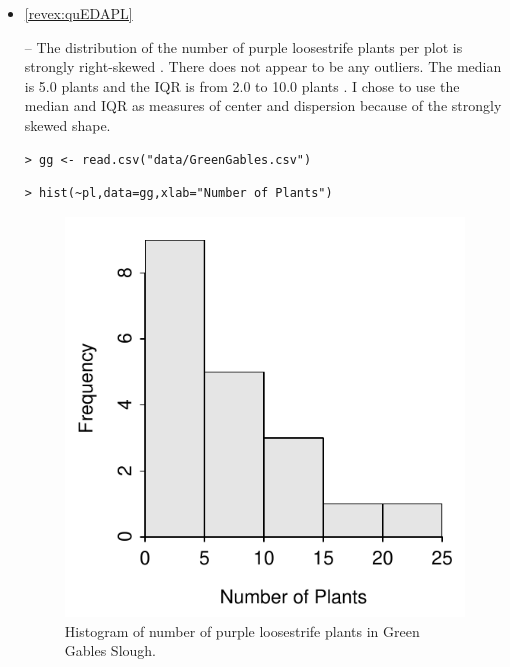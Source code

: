 \documentclass[10pt,openany]{book}\usepackage[]{graphicx}\usepackage[]{color}
\makeatletter
\newenvironment{kframe}{%
 \def\at@end@of@kframe{}%
 \ifinner\ifhmode%
  \def\at@end@of@kframe{\end{minipage}}%
  \begin{minipage}{\columnwidth}%
 \fi\fi%
 \def\FrameCommand##1{\hskip\@totalleftmargin \hskip-\fboxsep
 \colorbox{shadecolor}{##1}\hskip-\fboxsep
     \hskip-\linewidth \hskip-\@totalleftmargin \hskip\columnwidth}%
 \MakeFramed {\advance\hsize-\width
   \@totalleftmargin\z@ \linewidth\hsize
   \@setminipage}}%
 {\par\unskip\endMakeFramed%
 \at@end@of@kframe}
\newenvironment{knitrout}{}{} %
\makeatother
\begin{document}
\begin{itemize}
\begin{enumerate}
\begin{knitrout}
{}



\end{knitrout}
    \end{enumerate}

  \item \hypertarget{ans:quEDAPL}{\ref{revex:quEDAPL}} --  The distribution of the number of purple loosestrife plants per plot is strongly right-skewed .  There does not appear to be any outliers.  The median is 5.0 plants and the IQR is from 2.0 to 10.0 plants .  I chose to use the median and IQR as measures of center and dispersion because of the strongly skewed shape.
\begin{knitrout}
\color{fgcolor}\begin{kframe}
\begin{verbatim}
> gg <- read.csv("data/GreenGables.csv")
\end{verbatim}
\end{kframe}
\end{knitrout}
\begin{knitrout}
\color{fgcolor}\begin{kframe}
\begin{verbatim}
> hist(~pl,data=gg,xlab="Number of Plants")
\end{verbatim}
\end{kframe}\begin{figure}[hbtp]

{\centering \includegraphics[width=.4\linewidth]{Figs/PLHist-1} 

}

\caption[Histogram of number of purple loosestrife plants in Green Gables Slough]{Histogram of number of purple loosestrife plants in Green Gables Slough.}\label{fig:PLHist}
\end{figure}



\end{knitrout}
\end{itemize}
\end{document}
